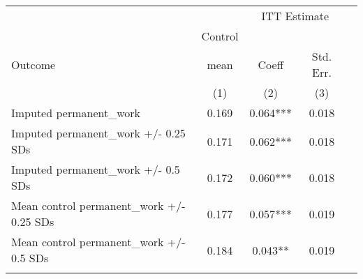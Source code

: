 \begin{tabular}{lcccc}
\hline \noalign{\smallskip} &  & \multicolumn{2}{c}{{ ITT Estimate}} & \\
\cline{3-4} & Control &  &  & \\
Outcome & mean & Coeff & Std. Err. & \\
 & (1) & (2) & (3) & \\
\noalign{\smallskip}\hline \noalign{\smallskip}Imputed permanent\_work & 0.169 & 0.064*** & 0.018 & \\
Imputed permanent\_work +/- 0.25 SDs & 0.171 & 0.062*** & 0.018 & \\
Imputed permanent\_work +/- 0.5 SDs & 0.172 & 0.060*** & 0.018 & \\
Mean control permanent\_work +/- 0.25 SDs & 0.177 & 0.057*** & 0.019 & \\
Mean control permanent\_work +/- 0.5 SDs & 0.184 & 0.043** & 0.019 & \\
\noalign{\smallskip}\hline\end{tabular}\\
